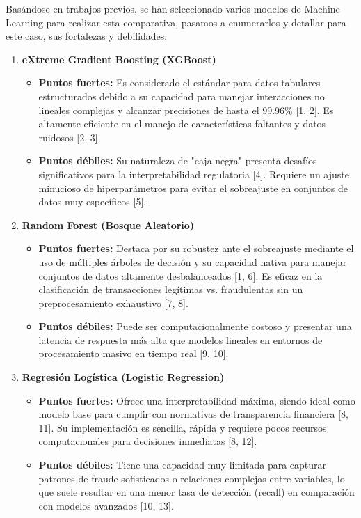 \documentclass[12pt,a4paper]{report}
\begin{document}
Basándose en trabajos previos, se han seleccionado varios modelos de Machine Learning para realizar esta comparativa, pasamos a enumerarlos y detallar para este caso, sus fortalezas y debilidades:

\begin{enumerate}
    \item \textbf{eXtreme Gradient Boosting (XGBoost)}
    \begin{itemize}
        \item \textbf{Puntos fuertes:} Es considerado el estándar para datos tabulares estructurados debido a su capacidad para manejar interacciones no lineales complejas y alcanzar precisiones de hasta el 99.96\% [1, 2]. Es altamente eficiente en el manejo de características faltantes y datos ruidosos [2, 3].
        \item \textbf{Puntos débiles:} Su naturaleza de "caja negra" presenta desafíos significativos para la interpretabilidad regulatoria [4]. Requiere un ajuste minucioso de hiperparámetros para evitar el sobreajuste en conjuntos de datos muy específicos [5].
    \end{itemize}

    \item \textbf{Random Forest (Bosque Aleatorio)}
    \begin{itemize}
        \item \textbf{Puntos fuertes:} Destaca por su robustez ante el sobreajuste mediante el uso de múltiples árboles de decisión y su capacidad nativa para manejar conjuntos de datos altamente desbalanceados [1, 6]. Es eficaz en la clasificación de transacciones legítimas vs. fraudulentas sin un preprocesamiento exhaustivo [7, 8].
        \item \textbf{Puntos débiles:} Puede ser computacionalmente costoso y presentar una latencia de respuesta más alta que modelos lineales en entornos de procesamiento masivo en tiempo real [9, 10].
    \end{itemize}

    \item \textbf{Regresión Logística (Logistic Regression)}
    \begin{itemize}
        \item \textbf{Puntos fuertes:} Ofrece una interpretabilidad máxima, siendo ideal como modelo base para cumplir con normativas de transparencia financiera [8, 11]. Su implementación es sencilla, rápida y requiere pocos recursos computacionales para decisiones inmediatas [8, 12].
        \item \textbf{Puntos débiles:} Tiene una capacidad muy limitada para capturar patrones de fraude sofisticados o relaciones complejas entre variables, lo que suele resultar en una menor tasa de detección (recall) en comparación con modelos avanzados [10, 13].
    \end{itemize}


\end{enumerate}
\end{document}
